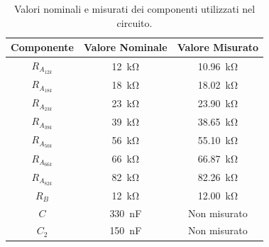 \def\arraystretch{1.3}
\begin{table}[h!]
	\centering
	\begin{tabular}{|c|c|c|}
		\hline
		Componente	& Valore Nominale & Valore Misurato \\ \hline
		$R_{A_{12k}}$ &\SI{12}{\kilo\ohm} & \SI{10.96}{\kilo\ohm} \\ \hline
		$R_{A_{18k}}$ &\SI{18}{\kilo\ohm} & \SI{18.02}{\kilo\ohm} \\ \hline
		$R_{A_{23k}}$ &\SI{23}{\kilo\ohm} & \SI{23.90}{\kilo\ohm} \\ \hline
		$R_{A_{39k}}$ &\SI{39}{\kilo\ohm} & \SI{38.65}{\kilo\ohm} \\ \hline
		$R_{A_{50k}}$ &\SI{56}{\kilo\ohm} & \SI{55.10}{\kilo\ohm} \\ \hline
		$R_{A_{66k}}$ &\SI{66}{\kilo\ohm} & \SI{66.87}{\kilo\ohm} \\ \hline
		$R_{A_{82k}}$ &\SI{82}{\kilo\ohm} & \SI{82.26}{\kilo\ohm} \\ \hline
		$R_B$ &\SI{12}{\kilo\ohm} & \SI{12.00}{\kilo\ohm} \\ \hline
		$C$ & \SI{330}{\nano\farad} & Non misurato \\ \hline
		$C_2$ & \SI{150}{\nano\farad} & Non misurato \\ \hline
	\end{tabular}
	\caption{Valori nominali e misurati dei componenti utilizzati nel circuito.}
	\label{tab:valori_componenti_3}
\end{table}


